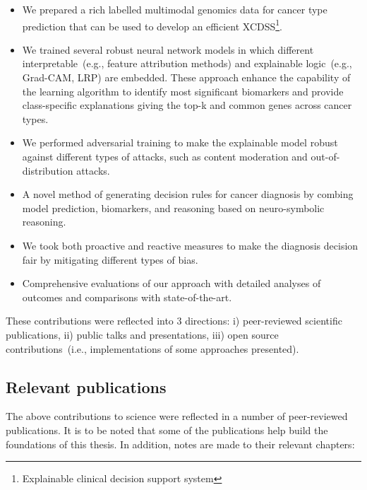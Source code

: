 \begin{itemize}[noitemsep]
    \item We prepared a rich labelled multimodal genomics data for cancer type prediction that can be used to develop an efficient XCDSS\footnote{Explainable clinical decision support system}.  
    \item We trained several robust neural network models in which different interpretable~(e.g., feature attribution methods) and explainable logic~(e.g., Grad-CAM, LRP) are embedded. These approach enhance the capability of the learning algorithm to identify most significant biomarkers and provide class-specific explanations giving the top-k and common genes across cancer types. 
    \item We performed adversarial training to make the explainable model robust against different types of attacks, such as content moderation and out-of-distribution attacks. 
    \item A novel method of generating decision rules for cancer diagnosis by combing model prediction, biomarkers, and reasoning based on neuro-symbolic reasoning. 
    \item We took both proactive and reactive measures to make the diagnosis decision fair by mitigating different types of bias. 
    \item Comprehensive evaluations of our approach with detailed analyses of outcomes and comparisons with state-of-the-art. 
\end{itemize}

\hspace*{3.5mm} These contributions were reflected into 3 directions: i) peer-reviewed scientific publications, ii) public talks and presentations, iii) open source contributions~(i.e., implementations of some approaches presented). %

\subsection{Relevant publications}
The above contributions to science were reflected in a number of peer-reviewed publications. It is to be noted that some of the publications help build the foundations of this thesis. In addition, notes are made to their relevant chapters: 

